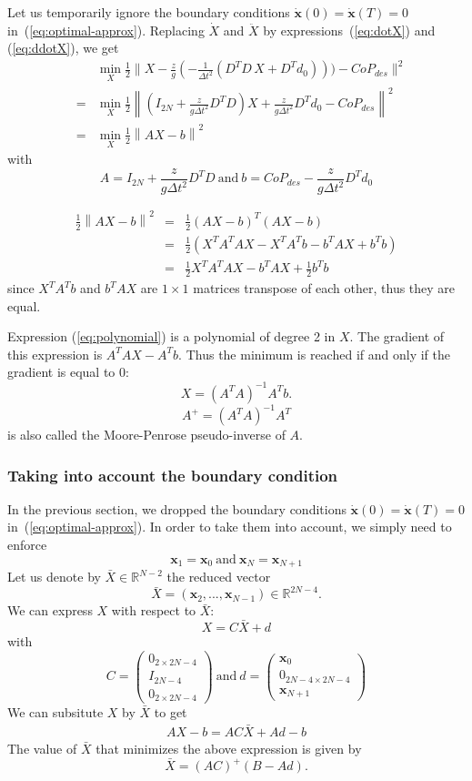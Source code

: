 \documentclass{article}
\newcommand\vect[1]{\mathbf{#1}}
\newcommand\x{\vect{x}}
\newcommand\dx{\vect{\dot{x}}}
\newcommand\reals{\mathbb{R}}
\newcommand\Xbar{\bar{X}}
\begin{document}
Let us temporarily ignore the boundary conditions $\dx(0)=\dx(T)=0$ in~(\ref{eq:optimal-approx}).
Replacing $\dot{X}$ and $\ddot{X}$ by expressions~(\ref{eq:dotX}) and (\ref{eq:ddotX}), we get
\begin{eqnarray*}
&&  \min_{X}\frac{1}{2}\|X - \frac{z}{g}(-\frac{1}{\Delta t^2} (D^TD\,X + D^Td_0))) - CoP_{des}\|^2\\
  &=&  \min_{X}\frac{1}{2}\left\|(I_{2N} + \frac{z}{g\Delta t^2}D^TD) X + \frac{z}{g\Delta t^2}D^Td_0 - CoP_{des}\right\|^2\\
  &=& \min_{X}\frac{1}{2}\left\| AX - b \right\|^2
\end{eqnarray*}
with
$$
A = I_{2N} + \frac{z}{g\Delta t^2}D^TD\ \mbox{and}\
  b = CoP_{des} - \frac{z}{g\Delta t^2}D^Td_0
$$

\begin{eqnarray}
  \frac{1}{2}\left\| AX - b \right\|^2 &=& \frac{1}{2}(AX - b)^T(AX - b)\\
  &=& \frac{1}{2}(X^T A^TAX - X^TA^T b - b^TAX + b^Tb)\\
  \label{eq:polynomial}
  &=& \frac{1}{2} X^T A^TAX -b^TAX + \frac{1}{2}b^Tb
\end{eqnarray}
since $X^TA^T b$ and $b^TAX$ are  $1\times 1$ matrices transpose of each other, thus they are equal.

Expression (\ref{eq:polynomial}) is a polynomial of degree 2 in $X$. The gradient of this
expression is $A^TAX -A^Tb$. Thus the minimum is reached if and only if the gradient is equal to 0:
$$
X = (A^TA)^{-1}A^Tb.
$$
$$
A^{+} = (A^TA)^{-1}A^T
$$
is also called the Moore-Penrose pseudo-inverse of $A$.

\subsubsection{Taking into account the boundary condition}

In the previous section, we dropped the boundary conditions $\dx(0)=\dx(T)=0$ in~(\ref{eq:optimal-approx}). In order to take them into account, we simply need to enforce
$$
\x_{1} = \x_{0}\ \mbox{and}\ \x_{N} = \x_{N+1}
$$
Let us denote by $\Xbar\in\reals^{N-2}$ the reduced vector
$$
\Xbar = (\x_2,...,\x_{N-1})\in\reals^{2N-4}.
$$
We can express $X$ with respect to $\Xbar$:
$$
X = C\Xbar + d
$$
with
$$
C = \left(\begin{array}{c}
  0_{2\times 2N-4}\\
  I_{2N-4}\\
  0_{2\times 2N-4}
\end{array}\right)\
\mbox{and}\ d=\left(\begin{array}{c}
  \x_0\\
  0_{2N-4\times 2N-4}\\
  \x_{N+1}
\end{array}\right)
$$
We can subsitute $X$ by $\Xbar$ to get
\begin{eqnarray*}
  AX-b = AC\Xbar+Ad - b
\end{eqnarray*}
The value of $\Xbar$ that minimizes the above expression is given by
$$
\Xbar = (AC)^{+}(B-Ad).
$$
\end{document}
